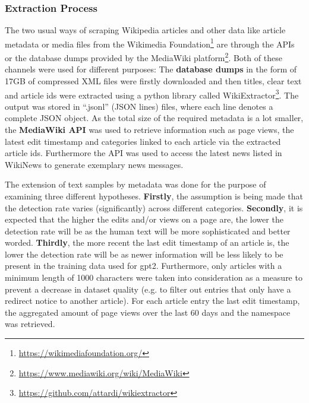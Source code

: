 \subsubsection{Extraction Process}
\label{sub:extraction_process}

The two usual ways of scraping Wikipedia articles and other data like article metadata or media files from the Wikimedia Foundation\footnote{\url{https://wikimediafoundation.org/}} are through the APIs or the database dumps provided by the MediaWiki platform\footnote{\url{https://www.mediawiki.org/wiki/MediaWiki}}.
Both of these channels were used for different purposes:
The \textbf{database dumps} in the form of 17GB of compressed XML files were firstly downloaded and then titles, clear text and article ids were extracted using a python library called WikiExtractor\footnote{\url{https://github.com/attardi/wikiextractor}}. The output was stored in “.jsonl” (JSON lines) files, where each line denotes a complete JSON object. As the total size of the required metadata is a lot smaller, the \textbf{MediaWiki API} was used to retrieve information such as page views, the latest edit timestamp and categories linked to each article via the extracted article ids. Furthermore the API was used to access the latest news listed in WikiNews to generate exemplary news messages.

The extension of text samples by metadata was done for the purpose of examining three different hypotheses. \textbf{Firstly}, the assumption is being made that the detection rate varies (significantly) across different categories. \textbf{Secondly}, it is expected that the higher the edits and/or views on a page are, the lower the detection rate will be as the human text will be more sophisticated and better worded. \textbf{Thirdly}, the more recent the last edit timestamp of an article is, the lower the detection rate will be as newer information will be less likely to be present in the training data used for \gls{gpt2}. Furthermore, only articles with a minimum length of 1000 characters were taken into consideration as a measure to prevent a decrease in dataset quality (e.g. to filter out entries that only have a redirect notice to another article). For each article entry the last edit timestamp, the aggregated amount of page views over the last 60 days and the namespace was retrieved.

